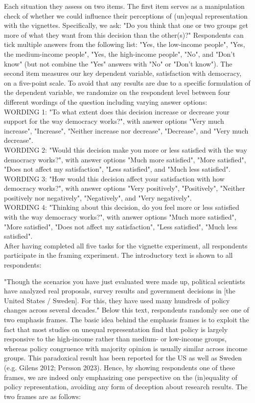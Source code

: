 \documentclass[12pt, letterpaper]{article}
\begin{document}
\begin{spacing}{1.5}
Each situation they assess on two items. The first item serves as a manipulation check of whether we could influence their perceptions of (un)equal representation with the vignettes. Specifically, we ask: "Do you think that one or two groups get more of what they want from this decision than the other(s)?" Respondents can tick multiple answers from the following list: "Yes, the low-income people", "Yes, the medium-income people", "Yes, the high-income people", "No", and "Don't know" (but not combine the "Yes" answers with "No" or "Don't know"). The second item measures our key dependent variable, satisfaction with democracy, on a five-point scale. To avoid that any results are due to a specific formulation of the dependent variable, we randomize on the respondent level between four different wordings of the question including varying answer options:\\

WORDING 1: "To what extent does this decision increase or decrease your support for the way democracy works?", with answer options "Very much increase", "Increase", "Neither increase nor decrease", "Decrease", and "Very much decrease".\\
WORDING 2: "Would this decision make you more or less satisfied with the way democracy works?", with answer options "Much more satisfied", "More satisfied", "Does not affect my satisfaction", "Less satisfied", and "Much less satisfied".\\
WORDING 3: "How would this decision affect your satisfaction with how democracy works?", with answer options "Very positively", "Positively", "Neither positively nor negatively", "Negatively", and "Very negatively".\\
WORDING 4: "Thinking about this decision, do you feel more or less satisfied with the way democracy works?", with answer options "Much more satisfied", "More satisfied", "Does not affect my satisfaction", "Less satisfied", "Much less satisfied".\\
After having completed all five tasks for the vignette experiment, all respondents participate in the framing experiment. The introductory text is shown to all respondents:

"Though the scenarios you have just evaluated were made up, political scientists have analyzed real proposals, survey results and government decisions in [the United States / Sweden]. For this, they have used many hundreds of policy changes across several decades."
Below this text, respondents randomly see one of two emphasis frames. The basic idea behind the emphasis frames is to exploit the fact that most studies on unequal representation find that policy is largely responsive to the high-income rather than medium- or low-income groups, whereas policy congruence with majority opinion is usually similar across income groups. This paradoxical result has been reported for the US as well as Sweden (e.g. Gilens 2012; Persson 2023). Hence, by showing respondents one of these frames, we are indeed only emphasizing one perspective on the (in)equality of policy representation, avoiding any form of deception about research results. The two frames are as follows:\


\end{spacing}
\end{document}
